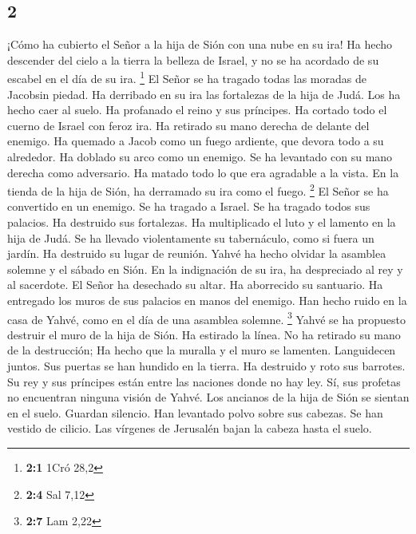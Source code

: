 \begin{paracol}{2}
\hypertarget{section-2}{%
\section{2}\label{section-2}}

 ¡Cómo ha cubierto el Señor a la hija de Sión con una nube
en su ira! Ha hecho descender del cielo a la tierra la belleza de
Israel, y no se ha acordado de su escabel en el día de su ira.
\footnote{\textbf{2:1} 1Cró 28,2}  El Señor se ha tragado
todas las moradas de Jacobsin piedad. Ha derribado en su ira las
fortalezas de la hija de Judá. Los ha hecho caer al suelo. Ha profanado
el reino y sus príncipes.  Ha cortado todo el cuerno de
Israel con feroz ira. Ha retirado su mano derecha de delante del
enemigo. Ha quemado a Jacob como un fuego ardiente, que devora todo a su
alrededor.  Ha doblado su arco como un enemigo. Se ha
levantado con su mano derecha como adversario. Ha matado todo lo que era
agradable a la vista. En la tienda de la hija de Sión, ha derramado su
ira como el fuego. \footnote{\textbf{2:4} Sal 7,12}  El
Señor se ha convertido en un enemigo. Se ha tragado a Israel. Se ha
tragado todos sus palacios. Ha destruido sus fortalezas. Ha multiplicado
el luto y el lamento en la hija de Judá.  Se ha llevado
violentamente su tabernáculo, como si fuera un jardín. Ha destruido su
lugar de reunión. Yahvé ha hecho olvidar la asamblea solemne y el sábado
en Sión. En la indignación de su ira, ha despreciado al rey y al
sacerdote.  El Señor ha desechado su altar. Ha aborrecido
su santuario. Ha entregado los muros de sus palacios en manos del
enemigo. Han hecho ruido en la casa de Yahvé, como en el día de una
asamblea solemne. \footnote{\textbf{2:7} Lam 2,22}  Yahvé
se ha propuesto destruir el muro de la hija de Sión. Ha estirado la
línea. No ha retirado su mano de la destrucción; Ha hecho que la muralla
y el muro se lamenten. Languidecen juntos.  Sus puertas se
han hundido en la tierra. Ha destruido y roto sus barrotes. Su rey y sus
príncipes están entre las naciones donde no hay ley. Sí, sus profetas no
encuentran ninguna visión de Yahvé.  Los ancianos de la
hija de Sión se sientan en el suelo. Guardan silencio. Han levantado
polvo sobre sus cabezas. Se han vestido de cilicio. Las vírgenes de
Jerusalén bajan la cabeza hasta el suelo.

\hypertarget{pensamientos-y-sentimientos-del-escritor-y-el-mundo-exterior-dios-cumpliuxf3-su-consejo}{%
}
\end{paracol}
